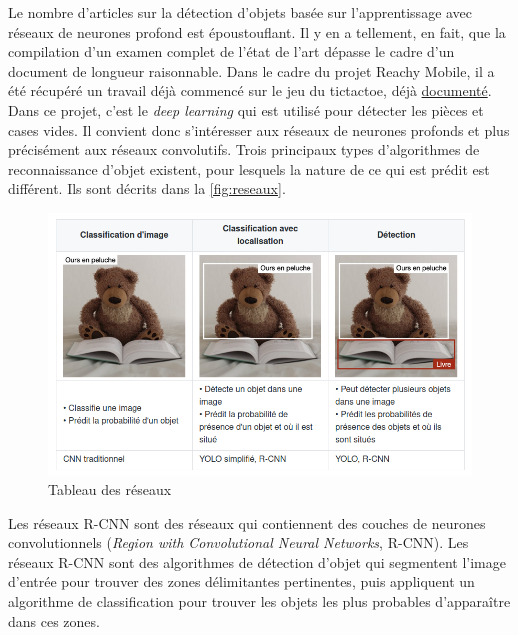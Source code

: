 Le nombre d'articles sur la détection d'objets basée sur l'apprentissage avec réseaux de neurones profond est époustouflant. Il y en a tellement, en fait, que la compilation d'un examen complet de l'état de l'art dépasse le cadre d'un document de longueur raisonnable. Dans le cadre du projet Reachy Mobile, il a été récupéré un travail déjà commencé sur le jeu du tictactoe, déjà \href{https://github.com/ta18/reachy-tictactoe_2021}{documenté}. Dans ce projet, c'est le \textit{deep learning} qui est utilisé pour détecter les pièces et cases vides. Il convient donc s'intéresser aux réseaux de neurones profonds et plus précisément aux réseaux convolutifs. Trois principaux types d'algorithmes de reconnaissance d'objet existent, pour lesquels la nature de ce qui est prédit est différent. Ils sont décrits dans la \autoref{fig:reseaux}. 
\begin{figure}[ht!]
    \centering
    \includegraphics[width=0.6\linewidth]{Rapport/images/reseaux.png}
    \caption{Tableau des réseaux}
    \label{fig:reseaux}
\end{figure}

Les réseaux R-CNN sont des réseaux qui contiennent des couches de neurones convolutionnels (\textit{Region with Convolutional Neural Networks}, R-CNN). Les réseaux R-CNN sont des algorithmes de détection d'objet qui segmentent l'image d'entrée pour trouver des zones délimitantes pertinentes, puis appliquent un algorithme de classification pour trouver les objets les plus probables d'apparaître dans ces zones.

